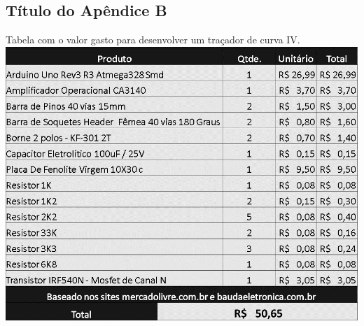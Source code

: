 \begin{apendicesenv}
	\chapter{Título do Apêndice B}
	Tabela com o valor gasto para desenvolver um traçador de curva IV.
		\FloatBarrier
		\includegraphics[scale=0.6]{PDFs/values.png}			\FloatBarrier
\end{apendicesenv}
